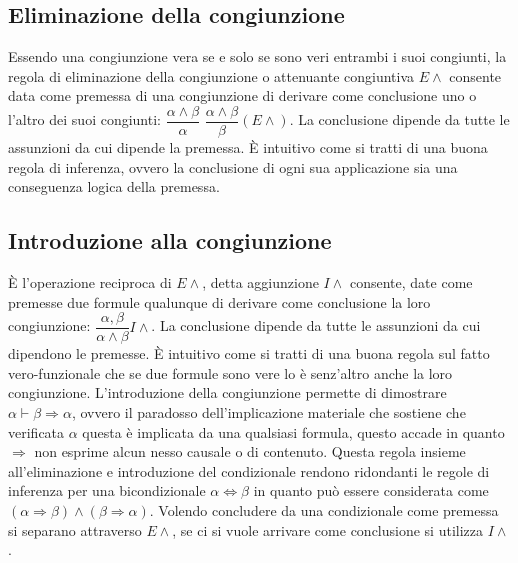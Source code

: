 \subsection{Eliminazione della congiunzione}
Essendo una congiunzione vera se e solo se sono veri entrambi i suoi congiunti, la regola di eliminazione della congiunzione o attenuante congiuntiva $E\land$ consente data come premessa di una 
congiunzione di derivare come conclusione uno o l'altro dei suoi congiunti: $\dfrac{\alpha\land\beta}{\alpha}$ $\dfrac{\alpha\land\beta}{\beta}(E\land)$. La conclusione dipende da tutte le assunzioni da cui 
dipende la premessa. \`E intuitivo come si tratti di una buona regola di inferenza, ovvero la conclusione di ogni sua applicazione sia una conseguenza logica della premessa. 
\subsection{Introduzione alla congiunzione}
\`E l'operazione reciproca di $E\land$, detta aggiunzione $I\land$ consente, date come premesse due formule qualunque di derivare come conclusione la loro congiunzione: $\dfrac{\alpha, \beta}
{\alpha\land\beta}I\land$. La conclusione dipende da tutte le assunzioni da cui dipendono le premesse. \`E intuitivo come si tratti di una buona regola sul fatto vero-funzionale che se due formule sono vere lo \`e 
senz'altro anche la loro congiunzione. L'introduzione della congiunzione permette di dimostrare $\alpha\vdash\beta\Rightarrow\alpha$, ovvero il paradosso dell'implicazione materiale che sostiene che 
verificata $\alpha$ questa \`e implicata da una qualsiasi formula, questo accade in quanto $\Rightarrow$ non esprime alcun nesso causale o di contenuto. Questa regola insieme all'eliminazione e introduzione 
del condizionale rendono ridondanti le regole di inferenza per una bicondizionale $\alpha\Leftrightarrow\beta$ in quanto pu\`o essere considerata come $(\alpha\Rightarrow\beta)
\land(\beta\Rightarrow\alpha)$. Volendo concludere da una condizionale come premessa si separano attraverso $E\land$, se ci si vuole arrivare come conclusione si utilizza $I\land$.
